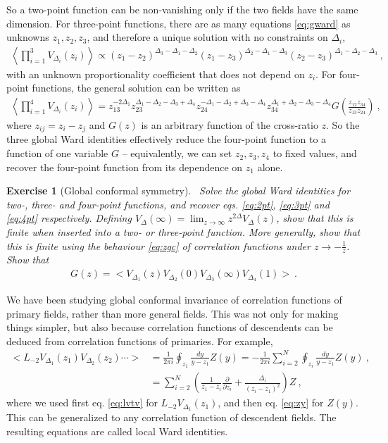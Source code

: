 \documentclass[12pt, a4paper]{article}
\theoremstyle{break}
\newtheorem{exo}{Exercise}[section]
\begin{document}
So a two-point function can be non-vanishing only if the two fields have the same dimension.
For three-point functions, there are as many equations \eqref{eq:gward} as unknowns $z_1,z_2,z_3$, and therefore a unique solution with no constraints on $\Delta_i$,
\begin{align}
 \left< \prod_{i=1}^3 V_{\Delta_i}(z_i) \right> \propto (z_1-z_2)^{\Delta_3-\Delta_1-\Delta_2} (z_1-z_3)^{\Delta_2-\Delta_1-\Delta_3} (z_2-z_3)^{\Delta_1-\Delta_2-\Delta_3}\ ,
 \label{eq:3pt}
\end{align}
with an unknown proportionality coefficient that does not depend on $z_i$.
For four-point functions, the general solution can be written as 
\begin{align}
 \left< \prod_{i=1}^4 V_{\Delta_i}(z_i) \right> 
 = z_{13}^{-2\Delta_1} z_{23}^{\Delta_1-\Delta_2-\Delta_3+\Delta_4} z_{24}^{-\Delta_1-\Delta_2+\Delta_3-\Delta_4} z_{34}^{\Delta_1+\Delta_2-\Delta_3-\Delta_4} G\left(\frac{z_{12}z_{34}}{z_{13}z_{24}}\right)\ ,
 \label{eq:4pt}
\end{align}
where $z_{ij} = z_i - z_j$ and $G(z)$ is an arbitrary function of the cross-ratio $z$. 
So the three global Ward identities effectively reduce the four-point function to a function of one variable $G$ -- equivalently, we can set $z_2,z_3,z_4$ to fixed values, and recover the four-point function from its dependence on $z_1$ alone. 

\begin{exo}[Global conformal symmetry]
~\label{exo:4pt}
Solve the global Ward identities for two-, three- and four-point functions, and recover eqs. \eqref{eq:2pt}, \eqref{eq:3pt} and \eqref{eq:4pt} respectively. 
Defining $V_\Delta(\infty) = \lim_{z\to\infty} z^{2\Delta}V_\Delta(z) $, show that this is finite when inserted into a two- or three-point function. More generally, show that this is finite using the behaviour \eqref{eq:zgc} of correlation functions under $z\to -\frac{1}{z}$. 
 Show that
 \begin{align}
  G(z) = \Big< V_{\Delta_1}(z) V_{\Delta_2}(0)V_{\Delta_3}(\infty)V_{\Delta_4}(1) \Big>\ .
 \end{align}
\end{exo}

We have been studying global conformal invariance of correlation functions of primary fields, rather than more general fields. This was not only for making things simpler, but also because correlation functions of descendents can be deduced from correlation functions of primaries. For example,
\begin{align}
 \Big< L_{-2}V_{\Delta_1}(z_1) V_{\Delta_2}(z_2)\cdots \Big>
  &= \frac{1}{2\pi i}\oint_{z_1} \frac{dy}{y-z_1} Z(y)
  = -\frac{1}{2\pi i} \sum_{i=2}^N \oint_{z_i} \frac{dy}{y-z_1} Z(y)\ ,
  \\
  &  =\sum_{i=2}^N\left(\frac{1}{z_1-z_i}\frac{\partial}{\partial z_i} +\frac{\Delta_i}{(z_i-z_1)^2}\right) Z\ ,
  \label{eq:ltv}
\end{align}
where we used first eq. \eqref{eq:lvtv} for $L_{-2}V_{\Delta_1}(z_1)$, and then eq. \eqref{eq:zy} for $Z(y)$.
This can be generalized to any correlation function of descendent fields. The resulting equations are called local Ward identities.
\end{document}
